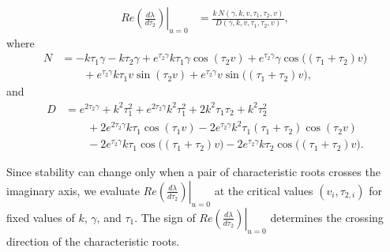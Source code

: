 \documentclass[11pt]{article}
\theoremstyle{remark}
\begin{document}
{

\begin{align}
Re\left.\left(\frac{d\lambda}{d\tau_2}\right)\right|_{u=0}
&=
\frac{k\,N(\gamma,k,v,\tau_1,\tau_2,v)}
     {D(\gamma,k,v,\tau_1,\tau_2,v)},
\end{align}
where
\begin{align}
N &=
-k\tau_1\gamma
-k\tau_2\gamma
+e^{\tau_2\gamma}k\tau_1\gamma\cos(\tau_2v)
+e^{\tau_2\gamma}\gamma\cos\bigl((\tau_1+\tau_2)v\bigr)
\nonumber\\
&\qquad
+e^{\tau_2\gamma}k\tau_1v\sin(\tau_2v)
+e^{\tau_2\gamma}v\sin\bigl((\tau_1+\tau_2)v\bigr),
\end{align}
and
\begin{align}
D &=
e^{2\tau_2\gamma}
+k^2\tau_1^2
+e^{2\tau_2\gamma}k^2\tau_1^2
+2k^2\tau_1\tau_2
+k^2\tau_2^2
\nonumber\\
&\qquad
+2e^{2\tau_2\gamma}k\tau_1\cos(\tau_1v)
-2e^{\tau_2\gamma}k^2\tau_1(\tau_1+\tau_2)\cos(\tau_2v)
\nonumber\\
&\qquad
-2e^{\tau_2\gamma}k\tau_1
\cos\bigl((\tau_1+\tau_2)v\bigr)
-2e^{\tau_2\gamma}k\tau_2
\cos\bigl((\tau_1+\tau_2)v\bigr).
\end{align}

Since stability can change only when a pair of characteristic roots crosses
the imaginary axis, we evaluate
$
Re\left.\left(\frac{d\lambda}{d\tau_2}\right)\right|_{u=0}
$
at the critical values
$
(v_i,\tau_{2,i})
$
for fixed values of $k$, $\gamma$, and $\tau_1$. The sign of
$
Re\left.\left(\frac{d\lambda}{d\tau_2}\right)\right|_{u=0}
$
determines the crossing direction of the characteristic roots.

}
\end{document}

